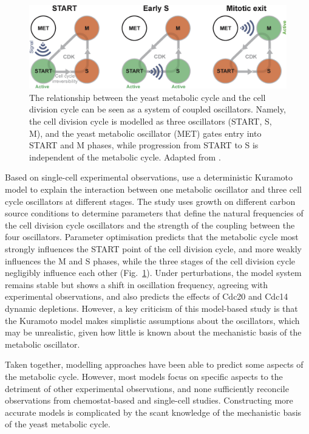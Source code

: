 \begin{figure}
  \centering
  \includegraphics[width=1.0\textwidth]{ozsezenInferenceHighLevelInteraction2019_7}
  \caption[
    The relationship between the yeast metabolic cycle and the cell division cycle can be seen as a system of coupled oscillators
  ]{
    The relationship between the yeast metabolic cycle and the cell division cycle can be seen as a system of coupled oscillators.
    Namely, the cell division cycle is modelled as three oscillators (START, S, M), and the yeast metabolic oscillator (MET) gates entry into START and M phases, while progression from START to S is independent of the metabolic cycle.
    Adapted from \textcite{ozsezenInferenceHighLevelInteraction2019}.}
  \label{fig:intro-ymc-coupled_oscillators}
\end{figure}

Based on single-cell experimental observations, \textcite{ozsezenInferenceHighLevelInteraction2019} use a deterministic Kuramoto model to explain the interaction between one metabolic oscillator and three cell cycle oscillators at different stages.
The study uses growth on different carbon source conditions to determine parameters that define the natural frequencies of the cell division cycle oscillators and the strength of the coupling between the four oscillators.
Parameter optimisation predicts that the metabolic cycle most strongly influences the START point of the cell division cycle, and more weakly influences the M and S phases, while the three stages of the cell division cycle negligibly influence each other (Fig.\ \ref{fig:intro-ymc-coupled_oscillators}).
Under perturbations, the model system remains stable but shows a shift in oscillation frequency, agreeing with experimental observations, and also predicts the effects of Cdc20 and Cdc14 dynamic depletions.
However, a key criticism of this model-based study is that the Kuramoto model makes simplistic assumptions about the oscillators, which may be unrealistic, given how little is known about the mechanistic basis of the metabolic oscillator.

Taken together, modelling approaches have been able to predict some aspects of the metabolic cycle.
However, most models focus on specific aspects to the detriment of other experimental observations, and none sufficiently reconcile observations from chemostat-based and single-cell studies.
Constructing more accurate models is complicated by the scant knowledge of the mechanistic basis of the yeast metabolic cycle.


